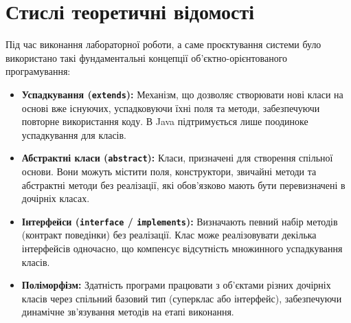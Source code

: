 \section{Стислі теоретичні відомості}

Під час виконання лабораторної роботи, а саме проєктування системи було використано 
такі фундаментальні концепції об'єктно-орієнтованого програмування:
\begin{itemize}
    \item \textbf{Успадкування (\texttt{extends}):} 
    Механізм, що дозволяє створювати нові класи на основі вже існуючих, успадковуючи 
    їхні поля та методи, забезпечуючи повторне використання коду. В Java підтримується 
    лише поодиноке успадкування для класів.
    \item \textbf{Абстрактні класи (\texttt{abstract}):} 
    Класи, призначені для створення спільної основи. Вони можуть містити поля, конструктори, 
    звичайні методи та абстрактні методи без реалізації, які обов'язково мають бути перевизначені
     в дочірніх класах.
    \item \textbf{Інтерфейси (\texttt{interface} / \texttt{implements}):} 
    Визначають певний набір методів (контракт поведінки) без реалізації. Клас може реалізовувати 
    декілька інтерфейсів одночасно, що компенсує відсутність множинного успадкування класів.
    \item \textbf{Поліморфізм:} 
    Здатність програми працювати з об'єктами різних дочірніх класів через спільний базовий 
    тип (суперклас або інтерфейс), забезпечуючи динамічне зв'язування методів на етапі виконання.
\end{itemize}
